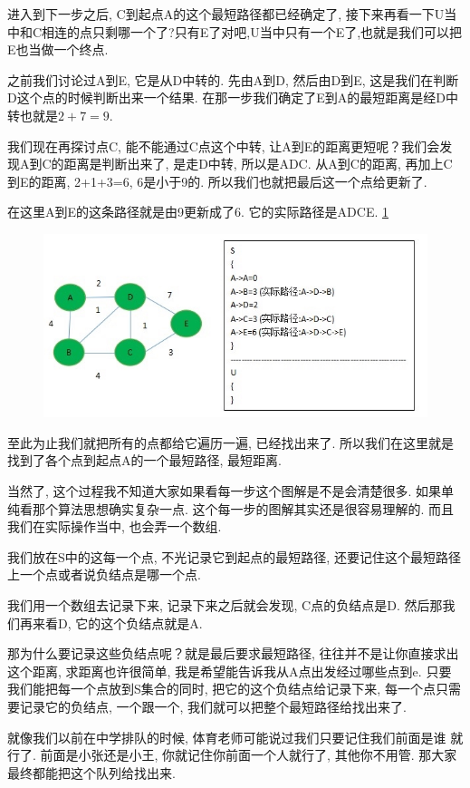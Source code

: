 进入到下一步之后, C到起点A的这个最短路径都已经确定了, 接下来再看一下U当中和C相连的点只剩哪一个了?只有E了对吧,U当中只有一个E了,也就是我们可以把E也当做一个终点. 

之前我们讨论过A到E, 它是从D中转的. 先由A到D, 然后由D到E, 这是我们在判断D这个点的时候判断出来一个结果. 在那一步我们确定了E到A的最短距离是经D中转也就是$2+7=9$. 

我们现在再探讨点C, 能不能通过C点这个中转, 让A到E的距离更短呢？我们会发现A到C的距离是判断出来了, 是走D中转, 所以是ADC. 从A到C的距离, 再加上C到E的距离, 2+1+3=6, 6是小于9的. 所以我们也就把最后这一个点给更新了. 

在这里A到E的这条路径就是由9更新成了6. 它的实际路径是ADCE. \ref{fig:img26_7} 

\begin{figure}[ht]
  \centering
  \caption{}
  \label{fig:img26_7}
  \includegraphics[width=0.7\linewidth]{asset/20230924051226.jpg}
\end{figure}

至此为止我们就把所有的点都给它遍历一遍, 已经找出来了. 所以我们在这里就是找到了各个点到起点A的一个最短路径, 最短距离. 

当然了, 这个过程我不知道大家如果看每一步这个图解是不是会清楚很多. 如果单纯看那个算法思想确实复杂一点. 这个每一步的图解其实还是很容易理解的. 而且我们在实际操作当中, 也会弄一个数组. 

我们放在S中的这每一个点, 不光记录它到起点的最短路径, 还要记住这个最短路径上一个点或者说负结点是哪一个点. 

我们用一个数组去记录下来, 记录下来之后就会发现, C点的负结点是D. 然后那我们再来看D, 它的这个负结点就是A. 

那为什么要记录这些负结点呢？就是最后要求最短路径, 往往并不是让你直接求出这个距离, 求距离也许很简单, 我是希望能告诉我从A点出发经过哪些点到e. 只要我们能把每一个点放到S集合的同时, 把它的这个负结点给记录下来, 每一个点只需要记录它的负结点, 一个跟一个, 我们就可以把整个最短路径给找出来了. 

就像我们以前在中学排队的时候, 体育老师可能说过我们只要记住我们前面是谁
就行了. 前面是小张还是小王, 你就记住你前面一个人就行了, 其他你不用管. 那大家最终都能把这个队列给找出来. 

